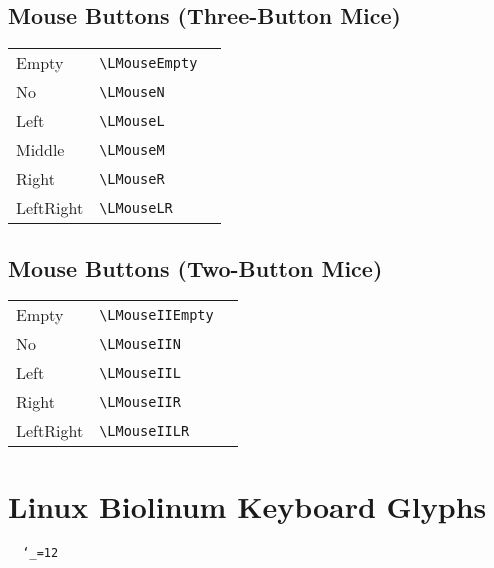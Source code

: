 \documentclass[11pt]{article}
\begin{document}
\clearpage
\subsection{Mouse Buttons (Three-Button Mice)}
\begin{longtable}[l]{lll}
Empty        & \verb|\LMouseEmpty|   & \LARGE\strut\fbox{\LMouseEmpty} \\
No           & \verb|\LMouseN|       & \LARGE\strut\fbox{\LMouseN} \\
Left         & \verb|\LMouseL|       & \LARGE\strut\fbox{\LMouseL} \\
Middle       & \verb|\LMouseM|       & \LARGE\strut\fbox{\LMouseM} \\
Right        & \verb|\LMouseR|      & \LARGE\strut\fbox{\LMouseR} \\
LeftRight    & \verb|\LMouseLR|      & \LARGE\strut\fbox{\LMouseLR} \\
\end{longtable}

\subsection{Mouse Buttons (Two-Button Mice)}
\begin{longtable}[l]{lll}
Empty        & \verb|\LMouseIIEmpty|   & \LARGE\strut\fbox{\LMouseIIEmpty} \\
No           & \verb|\LMouseIIN|       & \LARGE\strut\fbox{\LMouseIIN} \\
Left         & \verb|\LMouseIIL|       & \LARGE\strut\fbox{\LMouseIIL} \\
Right        & \verb|\LMouseIIR|       & \LARGE\strut\fbox{\LMouseIIR} \\
LeftRight    & \verb|\LMouseIILR|      & \LARGE\strut\fbox{\LMouseIILR} \\
\end{longtable}


\clearpage
\section{Linux Biolinum Keyboard Glyphs}\small\tt
\label{KeyboardGlyphs}
\renewcommand\DeclareTextGlyphY[3]{\makebox[2.5cm]{\LARGE\strut\fbox{\biolinumKeyGlyph{#2}}} #2\\}%
\catcode`\_=12%
\begin{multicols}{2}
\par\noindent

\end{multicols}
\end{document}
